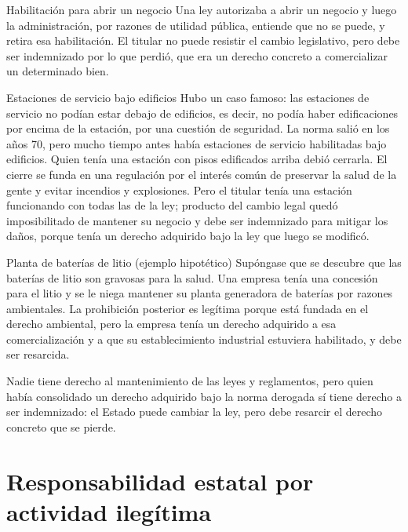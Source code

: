\documentclass[12pt,oneside]{book}
\begin{document}
\begin{example}{Habilitación para abrir un negocio}
Una ley autorizaba a abrir un negocio y luego la administración, por razones de utilidad pública, entiende que no se puede, y retira esa habilitación. El titular no puede resistir el cambio legislativo, pero debe ser indemnizado por lo que perdió, que era un derecho concreto a comercializar un determinado bien.
\end{example}

\begin{example}{Estaciones de servicio bajo edificios}
Hubo un caso famoso: las estaciones de servicio no podían estar debajo de edificios, es decir, no podía haber edificaciones por encima de la estación, por una cuestión de seguridad. La norma salió en los años 70, pero mucho tiempo antes había estaciones de servicio habilitadas bajo edificios. Quien tenía una estación con pisos edificados arriba debió cerrarla. El cierre se funda en una regulación por el interés común de preservar la salud de la gente y evitar incendios y explosiones. Pero el titular tenía una estación funcionando con todas las de la ley; producto del cambio legal quedó imposibilitado de mantener su negocio y debe ser indemnizado para mitigar los daños, porque tenía un derecho adquirido bajo la ley que luego se modificó.
\end{example}

\begin{example}{Planta de baterías de litio (ejemplo hipotético)}
Supóngase que se descubre que las baterías de litio son gravosas para la salud. Una empresa tenía una concesión para el litio y se le niega mantener su planta generadora de baterías por razones ambientales. La prohibición posterior es legítima porque está fundada en el derecho ambiental, pero la empresa tenía un derecho adquirido a esa comercialización y a que su establecimiento industrial estuviera habilitado, y debe ser resarcida.
\end{example}

\begin{important}
Nadie tiene derecho al mantenimiento de las leyes y reglamentos, pero quien había consolidado un derecho adquirido bajo la norma derogada sí tiene derecho a ser indemnizado: el Estado puede cambiar la ley, pero debe resarcir el derecho concreto que se pierde.
\end{important}

\section{Responsabilidad estatal por actividad ilegítima}
\end{document}
